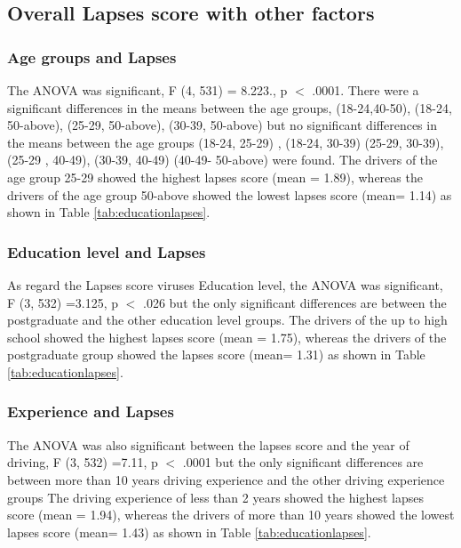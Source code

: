 \documentclass[preprint,12pt,a4paper,authoryear]{elsarticle}
\begin{document}
\subsection{Overall Lapses score with other factors}

\subsubsection{Age groups and Lapses}

 The ANOVA was significant, F (4, 531) = 8.223., p $<$ .0001. There were  a significant differences in the means between the age groups, (18-24,40-50), (18-24, 50-above), (25-29, 50-above), (30-39, 50-above)  but no significant differences in the means between the age groups (18-24, 25-29) , (18-24, 30-39) (25-29, 30-39), (25-29 , 40-49), (30-39, 40-49)   (40-49- 50-above) were found. The drivers of the age group 25-29 showed the highest lapses score (mean = 1.89), whereas the drivers of the age group 50-above showed the lowest lapses score (mean= 1.14) as shown in Table \ref{tab:educationlapses}.

\subsubsection{Education level and Lapses}

As regard the Lapses score viruses Education level, the ANOVA was significant, F (3, 532) =3.125, p $<$ .026 but the only significant differences are between the postgraduate and the other education level groups. The drivers of the up to high school showed the highest lapses score (mean = 1.75), whereas the drivers of the postgraduate group showed the lapses score (mean= 1.31) as shown in Table \ref{tab:educationlapses}.

\subsubsection{Experience and Lapses}

The ANOVA was also significant between the lapses score and the year of driving, F (3, 532) =7.11, p $<$ .0001 but the only significant differences are between more than 10 years driving experience and the other driving experience groups The driving experience of less than 2 years showed the highest lapses score (mean = 1.94), whereas the drivers of more than 10 years showed the lowest lapses score (mean= 1.43) as shown in Table \ref{tab:educationlapses}.
\end{document}
